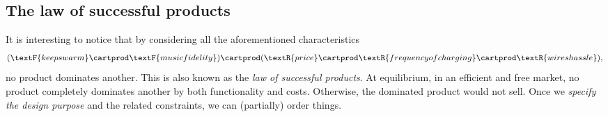 \subsection{The law of successful products}
It is interesting to notice that by considering all the aforementioned characteristics
\begin{equation}
    (\textF{keeps warm}\cartprod \textF{music fidelity})
    \cartprod (\textR{price}\cartprod \textR{frequency of charging}\cartprod \textR{wires hassle}),
\end{equation}
no product dominates another.
This is also known as the \emph{law of successful products}.
At equilibrium, in an efficient and free market, no product completely dominates another by both functionality and costs.
Otherwise, the dominated product would not sell.
Once we \emph{specify the design purpose} and the related constraints, we can (partially) order things.

